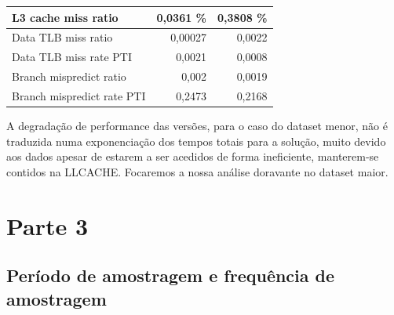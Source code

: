 \documentclass[conference,compsoc]{IEEEtran}
\begin{document}
\begin{itemize}
\begin{table}[H]
\begin{tabular}{ | l | r | r |   }
   
    L3 cache miss ratio	  & 0,0361 \%   &     0,3808 \%   \\ \hline      

   
  
  Data TLB miss ratio	 &    0,00027 &   0,0022     \\ \hline      
   
  Data TLB miss rate PTI	 &   0,0021 &   0,0008    \\ \hline      
  
  Branch mispredict ratio	 & 0,002   &     0,0019  \\ \hline      

  
  Branch mispredict rate PTI	 &  0,2473   &   0,2168    \\ \hline          
   
     \end{tabular}
  \end{table}
  
A degradação de performance das versões, para o caso do dataset menor, não é traduzida numa exponenciação dos tempos totais para a solução, muito devido aos dados  apesar de estarem a ser acedidos de forma ineficiente, manterem-se contidos na LLCACHE. Focaremos a nossa análise doravante no dataset maior.\par 




    
  
  \section{Parte 3 }

\subsection{Período de amostragem e frequência de amostragem}


\end{itemize}
\end{document}
